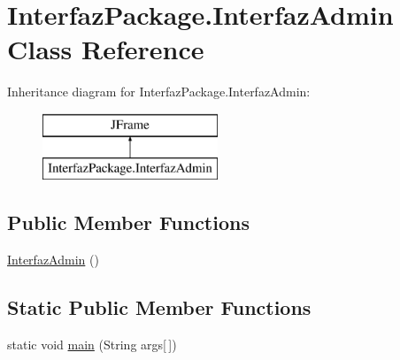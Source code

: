 \hypertarget{class_interfaz_package_1_1_interfaz_admin}{}\section{Interfaz\+Package.\+Interfaz\+Admin Class Reference}
\label{class_interfaz_package_1_1_interfaz_admin}
Inheritance diagram for Interfaz\+Package.\+Interfaz\+Admin\+:\begin{figure}[H]
\begin{center}
\leavevmode
\includegraphics[height=2.000000cm]{class_interfaz_package_1_1_interfaz_admin}
\end{center}
\end{figure}
\subsection*{Public Member Functions}
\begin{DoxyCompactItemize}
\item 
\mbox{\hyperlink{class_interfaz_package_1_1_interfaz_admin_a314844323c7cc2133f2e6e27e437f3c7}{Interfaz\+Admin}} ()
\end{DoxyCompactItemize}
\subsection*{Static Public Member Functions}
\begin{DoxyCompactItemize}
\item 
static void \mbox{\hyperlink{class_interfaz_package_1_1_interfaz_admin_a496951852701837eedb332a25d7e50ef}{main}} (String args\mbox{[}$\,$\mbox{]})
\end{DoxyCompactItemize}
